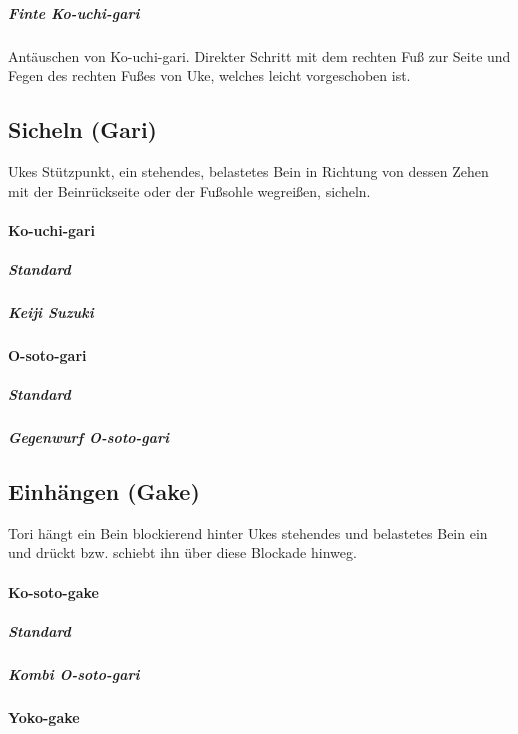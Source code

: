 \documentclass[justified, a4paper, notitlepage, captions=tableheading, nobib]{tufte-handout}
\begin{document}
\subparagraph{Finte Ko-uchi-gari}
\label{sec:org64aaad3}
Antäuschen von Ko-uchi-gari. Direkter Schritt mit dem rechten Fuß zur Seite und Fegen des rechten Fußes von Uke, welches leicht vorgeschoben ist.

\subsection{Sicheln (Gari) }
\label{sec:org3c4b07a}

Ukes Stützpunkt, ein stehendes, belastetes Bein in Richtung von dessen Zehen mit der Beinrückseite
oder der Fußsohle wegreißen, sicheln.

\paragraph{Ko-uchi-gari }
\label{sec:orgbd2ee8e}

\subparagraph{Standard}
\label{sec:org719196e}

\subparagraph{Keiji Suzuki}
\label{sec:orgde8ca95}

\paragraph{O-soto-gari }
\label{sec:org40a0c15}

\subparagraph{Standard}
\label{sec:org0b41546}

\subparagraph{Gegenwurf O-soto-gari}
\label{sec:org8ae220e}

\subsection{Einhängen (Gake) }
\label{sec:orgb30c162}

Tori hängt ein Bein blockierend hinter Ukes stehendes und belastetes Bein ein und drückt bzw.
schiebt ihn über diese Blockade hinweg.

\paragraph{Ko-soto-gake }
\label{sec:org1055c5d}

\subparagraph{Standard}
\label{sec:orga3dc3ba}

\subparagraph{Kombi O-soto-gari}
\label{sec:org09fb67a}

\paragraph{Yoko-gake }
\label{sec:org3884114}
\end{document}
